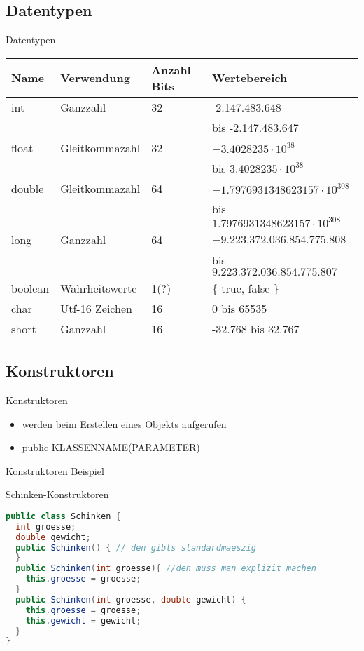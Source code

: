 \documentclass[18pt]{beamer}
\begin{document}
\subsection{Datentypen}
\begin{frame}{Datentypen}
\footnotesize
\begin{tabular}{|l|l|l|l|}
  \hline
  \textbf{Name} & \textbf{Verwendung} & \textbf{Anzahl Bits} & \textbf{Wertebereich} \\ \hline
 int & Ganzzahl & 32 & -2.147.483.648 \\
 & & & bis -2.147.483.647\\ \hline
 float & Gleitkommazahl & 32 & $-3.4028235 \cdot 10^{38}$ \\
 & & & bis $3.4028235 \cdot 10^{38}$\\\hline
 double & Gleitkommazahl & 64 & $-1.7976931348623157 \cdot 10^{308}$ \\ 
 & & & bis $1.7976931348623157 \cdot 10^{308}$ \\ \hline
 long & Ganzzahl & 64 & $-9.223.372.036.854.775.808$ \\ 
 & & & bis $9.223.372.036.854.775.807$ \\ \hline
 boolean & Wahrheitswerte & 1(?) & \{ true, false \} \\ \hline
 char & Utf-16 Zeichen & 16 &  0 bis 65535\\ \hline
 short  & Ganzzahl & 16 & -32.768 bis 32.767 \\ \hline
\end{tabular}
\end{frame}

\subsection{Konstruktoren}
\begin{frame}{Konstruktoren}
\begin{itemize}
\item werden beim Erstellen eines Objekts aufgerufen
\item public KLASSENNAME(PARAMETER)
\end{itemize}
\end{frame}

\begin{frame}[fragile]{Konstruktoren Beispiel}
\begin{exampleblock}{Schinken-Konstruktoren}
\begin{lstlisting}[language=java]
public class Schinken {
  int groesse;
  double gewicht;
  public Schinken() { // den gibts standardmaeszig
  }
  public Schinken(int groesse){ //den muss man explizit machen
    this.groesse = groesse;
  }
  public Schinken(int groesse, double gewicht) {
    this.groesse = groesse;
    this.gewicht = gewicht;
  }
}
\end{lstlisting}
\end{exampleblock}
\end{frame}
\end{document}
